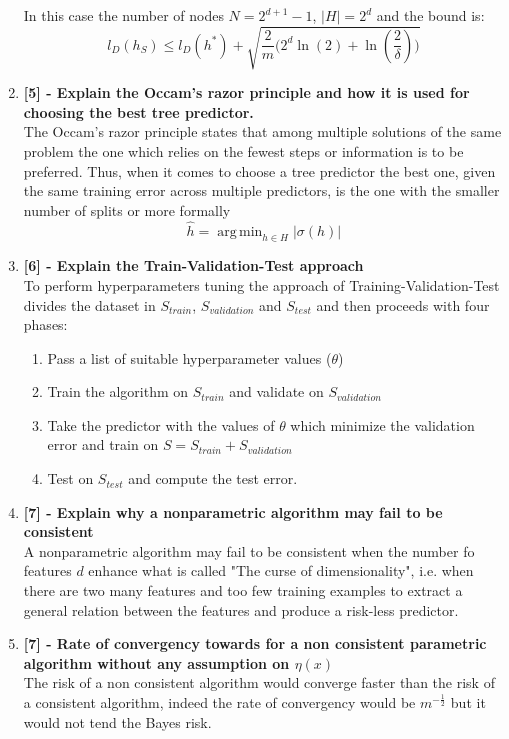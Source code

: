 \documentclass[a4paper]{report}
\DeclareMathOperator*{\argmin}{arg\,min}
\begin{document}
\begin{enumerate}
    In this case the number of nodes $N=2^{d+1}-1$, $|H| = 2^d$ and the bound is: \[l_{D}(h_{S}) \leq l_{D}(h^*) + \sqrt{\frac{2}{m}\big(2^{d}\ln({2}) + \ln({\frac{2}{\delta}})\big)}\]
    \item \textbf{[5] - Explain the Occam's razor principle and how it is used for choosing the best tree predictor.}\\
    The Occam's razor principle states that among multiple solutions of the same problem the one which relies on the fewest steps or information is to be preferred. Thus, when it comes to choose a tree predictor the best one, given the same training error across multiple predictors, is the one with the smaller number of splits or more formally \[\hat{h} = \argmin_{h \in H}|\sigma(h)|\]
    \item \textbf{[6] - Explain the Train-Validation-Test approach}\\
    To perform hyperparameters tuning the approach of Training-Validation-Test divides the dataset in $S_{train}$, $S_{validation}$ and $S_{test}$ and then proceeds with four phases:
    \begin{enumerate}
        \item Pass a list of suitable hyperparameter values ($\theta$)
        \item Train the algorithm on $S_{train}$ and validate on $S_{validation}$
        \item Take the predictor with the values of $\theta$ which minimize the validation error and train on $S = S_{train} + S_{validation}$
        \item Test on $S_{test}$ and compute the test error.
    \end{enumerate}
    \item \textbf{[7] - Explain why a nonparametric algorithm may fail to be consistent}\\
    A nonparametric algorithm may fail to be consistent when the number fo features $d$ enhance what is called "The curse of dimensionality", i.e. when there are two many features and too few training examples to extract a general relation between the features and produce a risk-less predictor.
    \item \textbf{[7] - Rate of convergency towards for a non consistent parametric algorithm without any assumption on $\eta(x)$}\\
    The risk of a non consistent algorithm would converge faster than the risk of a consistent algorithm, indeed the rate of convergency would be $m^{-\frac{1}{2}}$ but it would not tend the Bayes risk.

\end{enumerate}
\end{document}
